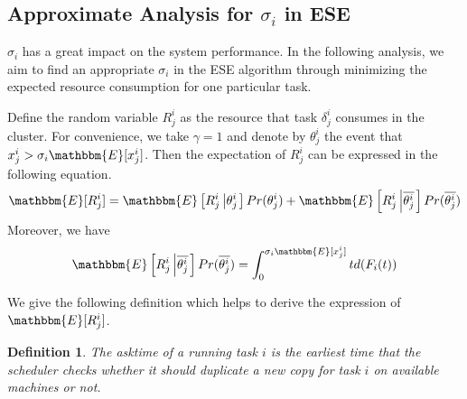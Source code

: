 \documentclass[10pt,conference]{IEEEtran}
\newtheorem{definition}{Definition}
\begin{document}
\subsection{Approximate Analysis for $\sigma_i$ in ESE}
$\sigma_i$ has a great impact on the system performance. In the following analysis,  we aim to find an appropriate $\sigma_i$  in the ESE algorithm through minimizing the expected resource consumption for one particular task.

Define the random variable $R^i_j$ as the resource that task $\delta^i_j$ consumes in the cluster. For convenience, we take $\gamma = 1$ and  denote by $\theta^i_j$ the event that $x^i_j > \sigma_i \mathbbm{E}[x^i_j]$. Then the expectation of $R^i_j$  can be expressed in the following equation.
\begin{equation}
 \mathbbm{E}[R^i_j] =\mathbbm{E} \left[ R^i_j \left|
  \theta^i_j \right. \right] Pr ( \theta^i_j ) + \mathbbm{E} \left[ R^i_j \left|
 \overline{\theta^i_j} \right. \right] Pr ( \overline{\theta^i_j} )
 \label{expected1}
\end{equation}
Moreover, we have
\begin{equation}
\mathbbm{E} \left[ R^i_j \left|
 \overline{\theta^i_j} \right. \right] Pr ( \overline{\theta^i_j} ) = \int_{0}^{\sigma_i \mathbbm{E}[x^i_j]}td(F_i(t))
  \label{expected2}
\end{equation}

We give the following definition which helps to derive the expression of $\mathbbm{E}[R^i_j]$.
\begin{definition}
The \textit{asktime} of a running task $i$ is the earliest time that the scheduler checks whether it should duplicate a new copy for task $i$ on available machines or not.
\end{definition}
\end{document}

